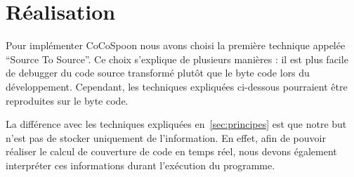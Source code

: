 \section{Réalisation}

Pour implémenter CoCoSpoon nous avons choisi la première technique appelée “Source To Source”\cite{baxter}. Ce choix s'explique de plusieurs manières : il est plus facile de debugger du code source transformé plutôt que le byte code lors du développement. Cependant, les techniques expliquées ci-dessous pourraient être reproduites sur le byte code. \par La différence avec les techniques expliquées en~\ref{sec:principes} est que notre but n'est pas de stocker uniquement de l'information. En effet, afin de pouvoir réaliser le calcul de couverture de code en temps réel, nous devons également interpréter ces informations durant l'exécution du programme. 
